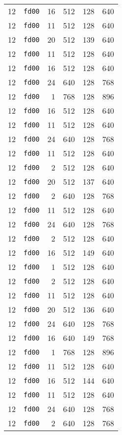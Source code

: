 \documentclass{article}
\begin{document}
\begin{table}[h!]
\begin{tabular}{llrrrl}
    12 & \texttt{fd00} & 16 & 512 & 128 & 640 \\
    12 & \texttt{fd00} & 11 & 512 & 128 & 640 \\
    12 & \texttt{fd00} & 20 & 512 & 139 & 640 \\
    12 & \texttt{fd00} & 11 & 512 & 128 & 640 \\
    12 & \texttt{fd00} & 16 & 512 & 128 & 640 \\
    12 & \texttt{fd00} & 24 & 640 & 128 & 768 \\
    12 & \texttt{fd00} & 1 & 768 & 128 & 896 \\
    12 & \texttt{fd00} & 16 & 512 & 128 & 640 \\
    12 & \texttt{fd00} & 11 & 512 & 128 & 640 \\
    12 & \texttt{fd00} & 24 & 640 & 128 & 768 \\
    12 & \texttt{fd00} & 11 & 512 & 128 & 640 \\
    12 & \texttt{fd00} & 2 & 512 & 128 & 640 \\
    12 & \texttt{fd00} & 20 & 512 & 137 & 640 \\
    12 & \texttt{fd00} & 2 & 640 & 128 & 768 \\
    12 & \texttt{fd00} & 11 & 512 & 128 & 640 \\
    12 & \texttt{fd00} & 24 & 640 & 128 & 768 \\
    12 & \texttt{fd00} & 2 & 512 & 128 & 640 \\
    12 & \texttt{fd00} & 16 & 512 & 149 & 640 \\
    12 & \texttt{fd00} & 1 & 512 & 128 & 640 \\
    12 & \texttt{fd00} & 2 & 512 & 128 & 640 \\
    12 & \texttt{fd00} & 11 & 512 & 128 & 640 \\
    12 & \texttt{fd00} & 20 & 512 & 136 & 640 \\
    12 & \texttt{fd00} & 24 & 640 & 128 & 768 \\
    12 & \texttt{fd00} & 16 & 640 & 149 & 768 \\
    12 & \texttt{fd00} & 1 & 768 & 128 & 896 \\
    12 & \texttt{fd00} & 11 & 512 & 128 & 640 \\
    12 & \texttt{fd00} & 16 & 512 & 144 & 640 \\
    12 & \texttt{fd00} & 11 & 512 & 128 & 640 \\
    12 & \texttt{fd00} & 24 & 640 & 128 & 768 \\
    12 & \texttt{fd00} & 2 & 640 & 128 & 768 \\

\end{tabular}
\end{table}
\end{document}
